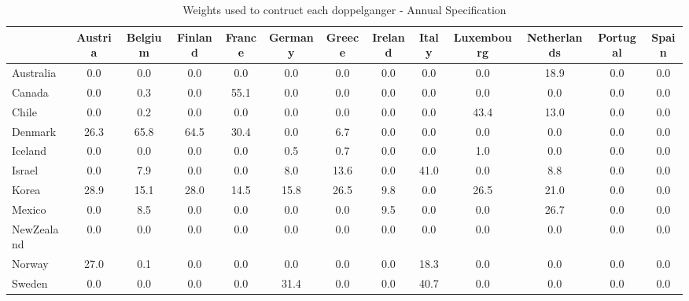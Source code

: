 \begin{table}[htbp]
\caption{\label{clabel} Weights used to contruct each doppelganger - Annual Specification}\centering\medskip
\begin{tabular}{lcccccccccccc} \hline \hline
 & Austria  & Belgium  & Finland  & France  & Germany  & Greece  & Ireland  & Italy  & Luxembourg  & Netherlands  & Portugal  & Spain  \\  \hline 
Australia &       0.0 &       0.0 &       0.0 &       0.0 &       0.0 &       0.0 &       0.0 &       0.0 &       0.0 &      18.9 &       0.0 &       0.0 \\  
Canada &       0.0 &       0.3 &       0.0 &      55.1 &       0.0 &       0.0 &       0.0 &       0.0 &       0.0 &       0.0 &       0.0 &       0.0 \\  
Chile &       0.0 &       0.2 &       0.0 &       0.0 &       0.0 &       0.0 &       0.0 &       0.0 &      43.4 &      13.0 &       0.0 &       0.0 \\  
Denmark &      26.3 &      65.8 &      64.5 &      30.4 &       0.0 &       6.7 &       0.0 &       0.0 &       0.0 &       0.0 &       0.0 &       0.0 \\  
Iceland &       0.0 &       0.0 &       0.0 &       0.0 &       0.5 &       0.7 &       0.0 &       0.0 &       1.0 &       0.0 &       0.0 &       0.0 \\  
Israel &       0.0 &       7.9 &       0.0 &       0.0 &       8.0 &      13.6 &       0.0 &      41.0 &       0.0 &       8.8 &       0.0 &       0.0 \\  
Korea &      28.9 &      15.1 &      28.0 &      14.5 &      15.8 &      26.5 &       9.8 &       0.0 &      26.5 &      21.0 &       0.0 &       0.0 \\  
Mexico &       0.0 &       8.5 &       0.0 &       0.0 &       0.0 &       0.0 &       9.5 &       0.0 &       0.0 &      26.7 &       0.0 &       0.0 \\  
NewZealand &       0.0 &       0.0 &       0.0 &       0.0 &       0.0 &       0.0 &       0.0 &       0.0 &       0.0 &       0.0 &       0.0 &       0.0 \\  
Norway &      27.0 &       0.1 &       0.0 &       0.0 &       0.0 &       0.0 &       0.0 &      18.3 &       0.0 &       0.0 &       0.0 &       0.0 \\  
Sweden &       0.0 &       0.0 &       0.0 &       0.0 &      31.4 &       0.0 &       0.0 &      40.7 &       0.0 &       0.0 &       0.0 &       0.0 \\  

\end{tabular}
\end{table}
